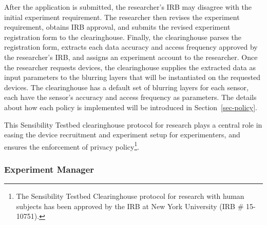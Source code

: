 After the application is submitted, the researcher's IRB may disagree with 
the initial experiment requirement. %
The researcher then revises the experiment requirement, obtains IRB approval, and
submits the revised experiment registration form to the clearinghouse. Finally, the clearinghouse
parses the registration form, extracts each data accuracy and access 
frequency approved by the researcher's IRB, and assigns an experiment 
account to the researcher. Once the researcher requests 
devices, the clearinghouse supplies the extracted data as input parameters to
the blurring layers that will be instantiated on the requested devices. The clearinghouse
has a default set of blurring layers for each sensor, each have the 
sensor's accuracy and access frequency as parameters. The details about
how each policy is implemented will be introduced in Section~\ref{sec-policy}.

This Sensibility Testbed
clearinghouse protocol for research plays a central role in
easing the device recruitment and experiment setup for experimenters, 
and ensures the enforcement
of privacy policy\footnote{\scriptsize The Sensibility Testbed Clearinghouse
protocol for research with human subjects has been approved by
the IRB at New York University (IRB \# 15-10751).}. 

\subsubsection{Experiment Manager}\label{sec-emt}

